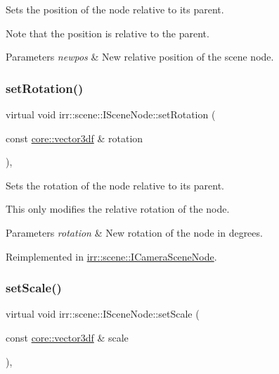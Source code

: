 Sets the position of the node relative to its parent. 

Note that the position is relative to the parent. 
\begin{DoxyParams}{Parameters}
{\em newpos} & New relative position of the scene node. \\
\hline
\end{DoxyParams}
\mbox{\label{classirr_1_1scene_1_1ISceneNode_adb6ff54f52d3a9e1514cd487a550935c}} 
\subsubsection{\texorpdfstring{set\+Rotation()}{setRotation()}}
{\footnotesize\ttfamily virtual void irr\+::scene\+::\+I\+Scene\+Node\+::set\+Rotation (\begin{DoxyParamCaption}\item[{const \hyperlink{namespaceirr_1_1core_a06f169d08b5c429f5575acb7edbad811}{core\+::vector3df} \&}]{rotation }\end{DoxyParamCaption})\hspace{0.3cm}{\ttfamily [inline]}, {\ttfamily [virtual]}}



Sets the rotation of the node relative to its parent. 

This only modifies the relative rotation of the node. 
\begin{DoxyParams}{Parameters}
{\em rotation} & New rotation of the node in degrees. \\
\hline
\end{DoxyParams}


Reimplemented in \hyperlink{classirr_1_1scene_1_1ICameraSceneNode_af95d5f50c192f212e11f3f050e92a470}{irr\+::scene\+::\+I\+Camera\+Scene\+Node}.

\mbox{\label{classirr_1_1scene_1_1ISceneNode_a1d710e1e20546bd89affe09fa943b0e2}} 
\subsubsection{\texorpdfstring{set\+Scale()}{setScale()}}
{\footnotesize\ttfamily virtual void irr\+::scene\+::\+I\+Scene\+Node\+::set\+Scale (\begin{DoxyParamCaption}\item[{const \hyperlink{namespaceirr_1_1core_a06f169d08b5c429f5575acb7edbad811}{core\+::vector3df} \&}]{scale }\end{DoxyParamCaption})\hspace{0.3cm}{\ttfamily [inline]}, {\ttfamily [virtual]}}



